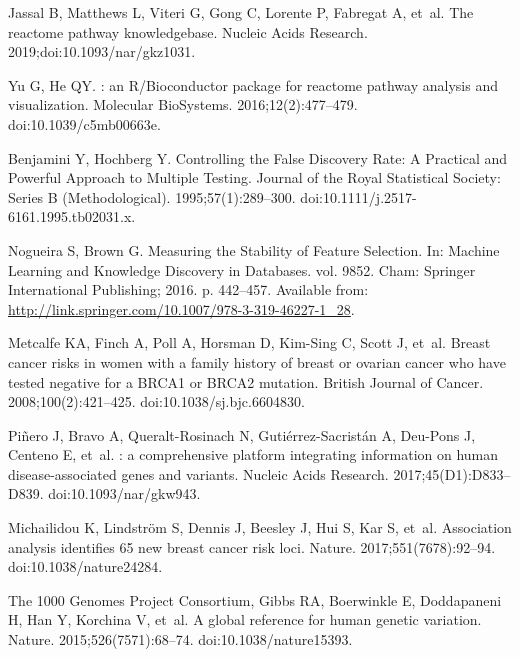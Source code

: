 \documentclass[10pt,letterpaper]{article}
\begin{document}
\begin{thebibliography}{10}
  Jassal B, Matthews L, Viteri G, Gong C, Lorente P, Fabregat A, et~al.
  \newblock The reactome pathway knowledgebase.
  \newblock Nucleic Acids Research. 2019;doi:{10.1093/nar/gkz1031}.
  
  Yu G, He QY.
  : an R/Bioconductor package for reactome pathway analysis
    and visualization.
  \newblock Molecular {BioSystems}. 2016;12(2):477--479.
  \newblock doi:{10.1039/c5mb00663e}.
  
  Benjamini Y, Hochberg Y.
  \newblock Controlling the False Discovery Rate: A Practical and Powerful
    Approach to Multiple Testing.
  \newblock Journal of the Royal Statistical Society: Series B (Methodological).
    1995;57(1):289--300.
  \newblock doi:{10.1111/j.2517-6161.1995.tb02031.x}.
  
  Nogueira S, Brown G.
  \newblock Measuring the {Stability} of {Feature} {Selection}.
  \newblock In: Machine {Learning} and {Knowledge} {Discovery} in {Databases}.
    vol. 9852. Cham: Springer International Publishing; 2016. p. 442--457.
  \newblock Available from:
    \url{http://link.springer.com/10.1007/978-3-319-46227-1_28}.
  
  Metcalfe KA, Finch A, Poll A, Horsman D, Kim-Sing C, Scott J, et~al.
  \newblock Breast cancer risks in women with a family history of breast or
    ovarian cancer who have tested negative for a {BRCA}1 or {BRCA}2 mutation.
  \newblock British Journal of Cancer. 2008;100(2):421--425.
  \newblock doi:{10.1038/sj.bjc.6604830}.
  
  Piñero J, Bravo A, Queralt-Rosinach N, Gutiérrez-Sacristán A, Deu-Pons J,
    Centeno E, et~al.
  : a comprehensive platform integrating information on human
    disease-associated genes and variants.
  \newblock Nucleic Acids Research. 2017;45(D1):D833--D839.
  \newblock doi:{10.1093/nar/gkw943}.
  
  Michailidou K, Lindstr\"{o}m S, Dennis J, Beesley J, Hui S, Kar S, et~al.
  \newblock Association analysis identifies 65 new breast cancer risk loci.
  \newblock Nature. 2017;551(7678):92--94.
  \newblock doi:{10.1038/nature24284}.
  
  {The 1000 Genomes Project Consortium}, Gibbs RA, Boerwinkle E, Doddapaneni H,
    Han Y, Korchina V, et~al.
  \newblock A global reference for human genetic variation.
  \newblock Nature. 2015;526(7571):68--74.
  \newblock doi:{10.1038/nature15393}.
  

\end{thebibliography}
\end{document}
